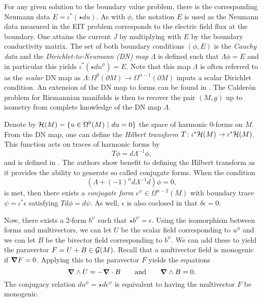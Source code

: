 \documentclass[12pt]{article}
\begin{document}

For any given solution to the boundary value problem, there is the corresponding Neumann data $E=\iota^*(\star d u)$.  As with $\phi$, the notation $E$ is used as the Neumann data measured in the EIT problem corresponds to the electric field flux at the boundary. One attains the current $J$ by multiplying with $E$ by the boundary conductivity matrix. The set of both boundary conditions $(\phi, E)$ is the \emph{Cauchy data} and the \emph{Dirichlet-to-Neumann (DN) map} $\Lambda$ is defined such that $\Lambda \phi = E$ and in particular this yields $\iota^*(\star d u^\phi)= E$. Note that this map $\Lambda$ is often referred to as the \emph{scalar} DN map as $\Lambda \colon \Omega^0(\partial M) \to \Omega^{n-1}(\partial M)$ inputs a scalar Dirichlet condition. An extension of the DN map to forms can be found in \cite{belishev_dirichlet_2008,sharafutdinov_complete_2013}. The Calder\'on problem for Riemannian manifolds is then to recover the pair $(M,g)$ up to isometry from complete knowledge of the DN map $\Lambda$. 

Denote by $\mathcal{H}(M) = \{u \in \Omega^0(M) ~\vert~ du=0\}$ the space of harmonic 0-forms on $M$.  From the DN map, one can define the \emph{Hilbert transform} $T\colon \iota^* \mathcal{H}(M) \to \iota^* \mathcal{H}(M)$.  This function acts on traces of harmonic forms by
\[
T \phi  = d\Lambda^{-1} \phi,
\]
and is defined in \cite{belishev_dirichlet_2008}. The authors show benefit to defining the Hilbert transform as it provides the ability to generate so called conjugate forms.  When the condition
\begin{equation}
\label{eq:conjugate_requirement}
\left( \Lambda + (-1)^{n}d\Lambda^{-1}d\right)\phi = 0, 
\end{equation}
is met, then there exists a \emph{conjugate form} $\epsilon^\psi \in \Omega^{n-2}(M)$ with boundary trace $\psi = \iota^* \epsilon$ satisfying $Td\phi = d \psi$. As well, $\epsilon$ is also coclosed in that $\delta \epsilon=0$. 

Now, there exists a 2-form $b^\psi$ such that $\star b^\psi = \epsilon$.  Using the isomorphism between forms and multivectors, we can let $U$ be the scalar field corresponding to $u^\phi$ and we can let $B$ be the bivector field corresponding to $b^\psi$.  We can add these to yield the paravector $F=U+B \in \mathcal{G}(M)$.   Recall that a multivector field is monogenic if $\boldsymbol{\nabla} F=0$.  Applying this to the paravector $F$ yields the equations
\[
\boldsymbol{\nabla} \wedge U = -\boldsymbol{\nabla} \cdot B \qquad \textrm{and} \qquad \boldsymbol{\nabla} \wedge B = 0.
\]
The conjugacy relation $du^\phi = \star d \epsilon^\psi$ is equivalent to having the multivector $F$ be monogenic.
\end{document}
